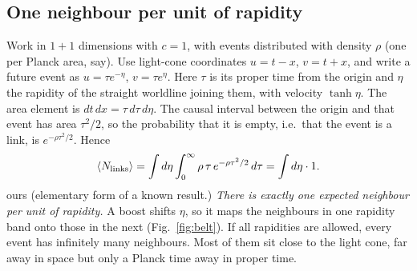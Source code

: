 \documentclass[11pt,a4paper]{article}
\newcommand{\tagbox}[2]{\textsf{\scriptsize\colorbox{#1!12}{\textcolor{#1!70!black}{#2}}}}
\newcommand{\ours}{\tagbox{orange}{ours}}
\begin{document}
\subsection{One neighbour per unit of rapidity}
Work in $1+1$ dimensions with $c=1$, with events distributed with density $\rho$ (one per Planck area, say). Use light-cone coordinates $u=t-x$, $v=t+x$, and write a future event as $u=\tau e^{-\eta}$, $v=\tau e^{\eta}$. Here $\tau$ is its proper time from the origin and $\eta$ the rapidity of the straight worldline joining them, with velocity $\tanh\eta$. The area element is $dt\,dx=\tau\,d\tau\,d\eta$. The causal interval between the origin and that event has area $\tau^2/2$, so the probability that it is empty, i.e.\ that the event is a link, is $e^{-\rho\tau^2/2}$. Hence
\begin{equation}
\langle N_{\rm links}\rangle=\int d\eta\int_0^\infty \rho\,\tau\,e^{-\rho\tau^2/2}\,d\tau=\int d\eta\cdot 1 .
\label{eq:onepereta}
\end{equation}
\ours{} (elementary form of a known result.) \emph{There is exactly one expected neighbour per unit of rapidity.} A boost shifts $\eta$, so it maps the neighbours in one rapidity band onto those in the next (Fig.~\ref{fig:belt}). If all rapidities are allowed, every event has infinitely many neighbours. Most of them sit close to the light cone, far away in space but only a Planck time away in proper time.
\end{document}
